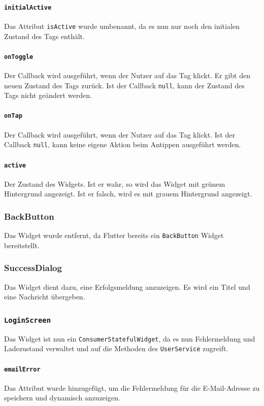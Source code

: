 \documentclass{implementierungsheft}
\begin{document}
\paragraph*{\texttt{initialActive}}
Das Attribut \texttt{isActive} wurde umbenannt, da es nun nur noch den initialen Zustand des Tags enthält.
\paragraph*{\texttt{onToggle}}
Der Callback wird ausgeführt, wenn der Nutzer auf das Tag klickt. Er gibt den neuen Zustand des Tags zurück. Ist der Callback \texttt{null}, kann der Zustand des Tags nicht geändert werden.
\paragraph*{\texttt{onTap}}
Der Callback wird ausgeführt, wenn der Nutzer auf das Tag klickt. Ist der Callback \texttt{null}, kann keine eigene Aktion beim Antippen ausgeführt werden.
\paragraph*{\texttt{active}}
Der Zustand des Widgets. Ist er wahr, so wird das Widget mit grünem Hintergrund angezeigt. Ist er falsch, wird es mit grauem Hintergrund angezeigt.
\subsubsection*{BackButton}
Das Widget wurde entfernt, da Flutter bereits ein \texttt{BackButton} Widget bereitstellt.
\subsubsection*{SuccessDialog}
Das Widget dient dazu, eine Erfolgsmeldung anzuzeigen. Es wird ein Titel und eine Nachricht übergeben.
\subsubsection{\texttt{LoginScreen}}
Das Widget ist nun ein \texttt{ConsumerStatefulWidget}, da es nun Fehlermeldung und Ladezustand verwaltet und auf die Methoden des \texttt{UserService} zugreift.
\paragraph{\texttt{emailError}}
Das Attribut wurde hinzugefügt, um die Fehlermeldung für die E-Mail-Adresse zu speichern und dynamisch anzuzeigen.
\end{document}

